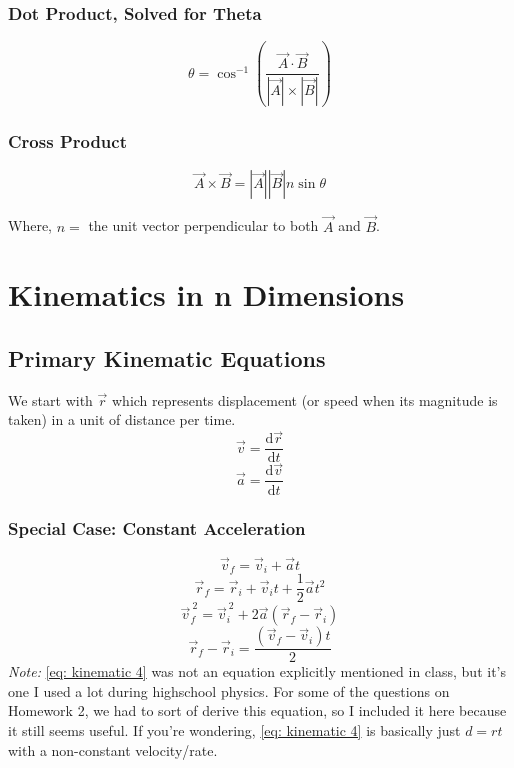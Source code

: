 \documentclass{article}
\begin{document}
\subsubsection{Dot Product, Solved for Theta}
\begin{equation}
    \theta = \cos^{-1} \left( {\frac{\vec{A} \cdot \vec{B}}{|\vec{A}| \times |\vec{B}|}} \right)
\end{equation}

\subsubsection{Cross Product}
\begin{equation}
    \vec{A} \times \vec{B} = |\vec{A}||\vec{B}| n \sin \theta
\end{equation}

Where, $n = $ the unit vector perpendicular to both $\vec{A}$ and $\vec{B}$.



\newpage \section{Kinematics in n Dimensions}
\subsection{Primary Kinematic Equations}
We start with $\vec{r}$ which represents displacement (or speed when its magnitude is taken) in a unit of distance per time.
\begin{equation}
    \vec{v} = \frac{\mathrm{d}\vec{r}}{\mathrm{d}t}
\end{equation}
\begin{equation}
    \vec{a} = \frac{\mathrm{d}\vec{v}}{\mathrm{d}t}
    \end{equation}
    \subsubsection{Special Case: Constant Acceleration} \label{kinematics const a}
    \begin{equation}\label{eq: kinematic 1}
    \vec{v}_f = \vec{v}_i + \vec{a}t
\end{equation}
\begin{equation}\label{eq: kinematic 2}
    \vec{r}_f = \vec{r}_i + \vec{v}_it+ \frac{1}{2}\vec{a}t^2 
\end{equation}
\begin{equation}\label{eq: kinematic 3}
    \vec{v}_f^{ \: 2} = \vec{v}_i^{ \: 2} + 2 \vec{a} (\vec{r}_f - \vec{r}_i)
\end{equation}
\begin{equation}\label{eq: kinematic 4}
    \vec{r}_f - \vec{r}_i = \frac{(\vec{v}_f - \vec{v}_i)t}{2}
\end{equation}
\textit{Note:} \ref{eq: kinematic 4} was not an equation explicitly mentioned in class, but it's one I used a lot during highschool physics. For some of the questions on Homework 2, we had to sort of derive this equation, so I included it here because it still seems useful. If you're wondering, \ref{eq: kinematic 4} is basically just $d = rt$ with a non-constant velocity/rate.
\end{document}
